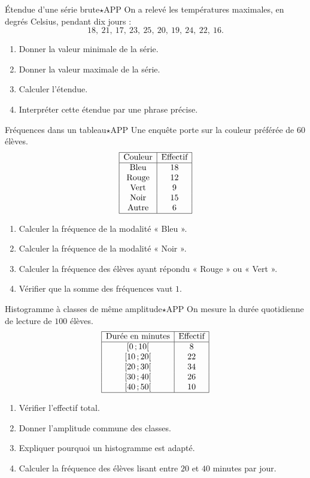 \documentclass[11pt,a4paper]{article}
\newcommand{\classe}[2]{\ensuremath{[#1\,;#2[}}
\newcounter{exo}
\begin{document}
\begin{exobox}{Étendue d'une série brute}{$\star$}{APP}
On a relevé les températures maximales, en degrés Celsius, pendant dix jours :
\[
18,\ 21,\ 17,\ 23,\ 25,\ 20,\ 19,\ 24,\ 22,\ 16.
\]
\begin{enumerate}
\item Donner la valeur minimale de la série.
\item Donner la valeur maximale de la série.
\item Calculer l'étendue.
\item Interpréter cette étendue par une phrase précise.
\end{enumerate}
\end{exobox}

\begin{exobox}{Fréquences dans un tableau}{$\star$}{APP}
Une enquête porte sur la couleur préférée de $60$ élèves.
\[
\begin{array}{|c|c|}
\hline
\text{Couleur} & \text{Effectif} \\
\hline
\text{Bleu} & 18 \\
\text{Rouge} & 12 \\
\text{Vert} & 9 \\
\text{Noir} & 15 \\
\text{Autre} & 6 \\
\hline
\end{array}
\]
\begin{enumerate}
\item Calculer la fréquence de la modalité « Bleu ».
\item Calculer la fréquence de la modalité « Noir ».
\item Calculer la fréquence des élèves ayant répondu « Rouge » ou « Vert ».
\item Vérifier que la somme des fréquences vaut $1$.
\end{enumerate}
\end{exobox}

\begin{exobox}{Histogramme à classes de même amplitude}{$\star$}{APP}
On mesure la durée quotidienne de lecture de $100$ élèves.
\[
\begin{array}{|c|c|}
\hline
\text{Durée en minutes} & \text{Effectif} \\
\hline
\classe{0}{10} & 8 \\
\classe{10}{20} & 22 \\
\classe{20}{30} & 34 \\
\classe{30}{40} & 26 \\
\classe{40}{50} & 10 \\
\hline
\end{array}
\]
\begin{enumerate}
\item Vérifier l'effectif total.
\item Donner l'amplitude commune des classes.
\item Expliquer pourquoi un histogramme est adapté.
\item Calculer la fréquence des élèves lisant entre $20$ et $40$ minutes par jour.
\end{enumerate}
\end{exobox}
\end{document}
